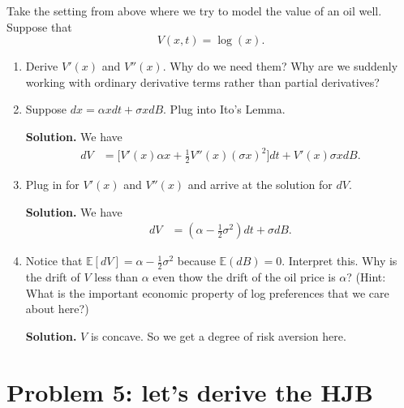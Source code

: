 \documentclass[11pt]{extarticle}
\theoremstyle{plain}
\theoremstyle{definition}
\begin{document}
Take the setting from above where we try to model the value of an oil well. Suppose that 
\begin{equation*}
	V(x, t) = \log(x).
\end{equation*}

\begin{enumerate}
\item Derive $V'(x)$ and $V''(x)$. Why do we need them? Why are we suddenly working with ordinary derivative terms rather than partial derivatives? 

\item Suppose $dx = \alpha x dt + \sigma x dB$. Plug into Ito's Lemma.

\vspace{5mm}
\noindent
\textbf{Solution.} We have
\begin{align*}
	dV &= \bigg[ V'(x) \alpha x + \frac{1}{2} V''(x) (\sigma x)^2 \bigg] dt + V'(x) \sigma x dB.
\end{align*}


\item Plug in for $V'(x)$ and $V''(x)$ and arrive at the solution for $dV$. 

\vspace{5mm}
\noindent
\textbf{Solution.} We have
\begin{align*}
	dV &= (\alpha - \frac{1}{2} \sigma^2 ) dt + \sigma dB.
\end{align*}


\item Notice that $\mathbb E[ dV ] = \alpha - \frac{1}{2} \sigma^2$ because $\mathbb E (dB) = 0$. Interpret this. Why is the drift of $V$ less than $\alpha$ even thow the drift of the oil price is $\alpha$? (Hint: What is the important economic property of log preferences that we care about here?)

\vspace{5mm}
\noindent
\textbf{Solution.} $V$ is concave. So we get a degree of risk aversion here.

\end{enumerate}





\vspace{10mm}
\section*{Problem 5: let's derive the HJB}
\end{document}
